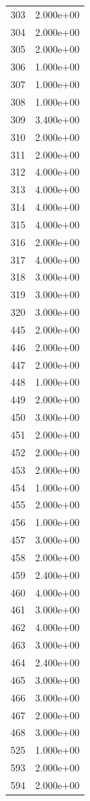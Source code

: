 \documentclass[12pt]{article}
\begin{document}
\begin{longtable}{@{}cc@{}}
303 & 2.000e+00 \\
304 & 2.000e+00 \\
305 & 2.000e+00 \\
306 & 1.000e+00 \\
307 & 1.000e+00 \\
308 & 1.000e+00 \\
309 & 3.400e+00 \\
310 & 2.000e+00 \\
311 & 2.000e+00 \\
312 & 4.000e+00 \\
313 & 4.000e+00 \\
314 & 4.000e+00 \\
315 & 4.000e+00 \\
316 & 2.000e+00 \\
317 & 4.000e+00 \\
318 & 3.000e+00 \\
319 & 3.000e+00 \\
320 & 3.000e+00 \\
445 & 2.000e+00 \\
446 & 2.000e+00 \\
447 & 2.000e+00 \\
448 & 1.000e+00 \\
449 & 2.000e+00 \\
450 & 3.000e+00 \\
451 & 2.000e+00 \\
452 & 2.000e+00 \\
453 & 2.000e+00 \\
454 & 1.000e+00 \\
455 & 2.000e+00 \\
456 & 1.000e+00 \\
457 & 3.000e+00 \\
458 & 2.000e+00 \\
459 & 2.400e+00 \\
460 & 4.000e+00 \\
461 & 3.000e+00 \\
462 & 4.000e+00 \\
463 & 3.000e+00 \\
464 & 2.400e+00 \\
465 & 3.000e+00 \\
466 & 3.000e+00 \\
467 & 2.000e+00 \\
468 & 3.000e+00 \\
525 & 1.000e+00 \\
593 & 2.000e+00 \\
594 & 2.000e+00 \\

\end{longtable}
\end{document}
